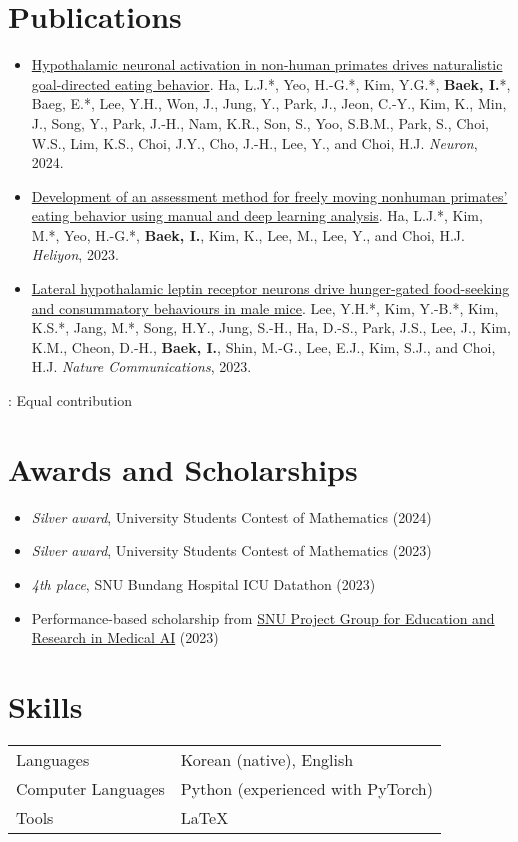 \documentclass[10pt, a4paper]{article}
\newenvironment{customitemize}
	{\begin{itemize}[leftmargin=*, noitemsep, topsep=0pt, label=$\cdot$]}
	{\end{itemize}}
\begin{document}
\section*{Publications}
\begin{customitemize}
    \item \href{https://doi.org/10.1016/j.neuron.2024.03.029}{Hypothalamic neuronal activation in non-human primates drives naturalistic goal-directed eating behavior}. Ha, L.J.*, Yeo, H.-G.*, Kim, Y.G.*, {\bf Baek, I.}*, Baeg, E.*, Lee, Y.H., Won, J., Jung, Y., Park, J., Jeon, C.-Y., Kim, K., Min, J., Song, Y., Park, J.-H., Nam, K.R., Son, S., Yoo, S.B.M., Park, S., Choi, W.S., Lim, K.S., Choi, J.Y., Cho, J.-H., Lee, Y., and Choi, H.J. {\it Neuron}, 2024. 
    \item \href{https://doi.org/10.1016/j.heliyon.2024.e25561}{Development of an assessment method for freely moving nonhuman primates' eating behavior using manual and deep learning analysis}. Ha, L.J.*, Kim, M.*, Yeo, H.-G.*, {\bf Baek, I.}, Kim, K., Lee, M., Lee, Y., and Choi, H.J. {\it Heliyon}, 2023. 
    \item \href{https://doi.org/10.1038/s41467-023-37044-4}{Lateral hypothalamic leptin receptor neurons drive hunger-gated food-seeking and consummatory behaviours in male mice}. Lee, Y.H.*, Kim, Y.-B.*, Kim, K.S.*, Jang, M.*, Song, H.Y., Jung, S.-H., Ha, D.-S., Park, J.S., Lee, J., Kim, K.M., Cheon, D.-H., {\bf Baek, I.}, Shin, M.-G., Lee, E.J., Kim, S.J., and Choi, H.J. {\it Nature Communications}, 2023. 
\end{customitemize}
\null \hfill {\footnotesize *: Equal contribution}


\section*{Awards and Scholarships}
\begin{customitemize}
    \item \textit{Silver award}, University Students Contest of Mathematics (2024)
    \item \textit{Silver award}, University Students Contest of Mathematics (2023)
    \item \textit{4th place}, SNU Bundang Hospital ICU Datathon (2023)
    \item Performance-based scholarship from \href{http://snuaimed.org/}{SNU Project Group for Education and Research in Medical AI} (2023)
\end{customitemize}

\section*{Skills}
\begin{tabular}{@{}ll@{}}
    Languages & Korean (native), English\\
    Computer Languages & Python (experienced with PyTorch) \\
    Tools & \LaTeX
\end{tabular}
\end{document}
